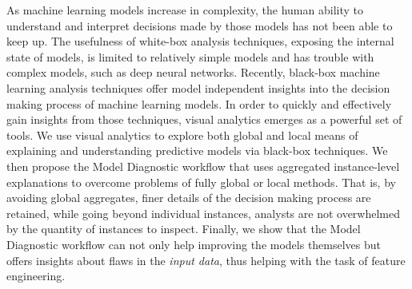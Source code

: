 As machine learning models increase in complexity, the human ability to understand and interpret decisions made by those models has not been able to keep up.
The usefulness of white-box analysis techniques, exposing the internal state of models, is limited to relatively simple models and has trouble with complex models, such as deep neural networks.
Recently, black-box machine learning analysis techniques offer model independent insights into the decision making process of machine learning models.
In order to quickly and effectively gain insights from those techniques, visual analytics emerges as a powerful set of tools.
We use visual analytics to explore both global and local means of explaining and understanding predictive models via black-box techniques.
We then propose the Model Diagnostic workflow that uses aggregated instance-level explanations to overcome problems of fully global or local methods.
That is, by avoiding global aggregates, finer details of the decision making process are retained, while going beyond individual instances, analysts are not overwhelmed by the quantity of instances to inspect.
Finally, we show that the Model Diagnostic workflow can not only help improving the models themselves but offers insights about flaws in the \emph{input data}, thus helping with the task of feature engineering.


